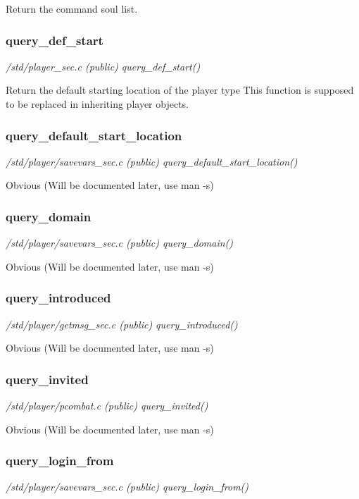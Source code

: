 Return the command soul list.


\subsubsection{query\_def\_start}

{\em /std/player\_sec.c (public) query\_def\_start()}

Return the default starting location of the player type
This function is supposed to be replaced in inheriting
player objects.


\subsubsection{query\_default\_start\_location}

{\em /std/player/savevars\_sec.c (public) query\_default\_start\_location()}

Obvious (Will be documented later, use man -s)


\subsubsection{query\_domain}

{\em /std/player/savevars\_sec.c (public) query\_domain()}

Obvious (Will be documented later, use man -s)


\subsubsection{query\_introduced}

{\em /std/player/getmsg\_sec.c (public) query\_introduced()}

Obvious (Will be documented later, use man -s)


\subsubsection{query\_invited}

{\em /std/player/pcombat.c (public) query\_invited()}

Obvious (Will be documented later, use man -s)


\subsubsection{query\_login\_from}

{\em /std/player/savevars\_sec.c (public) query\_login\_from()}

